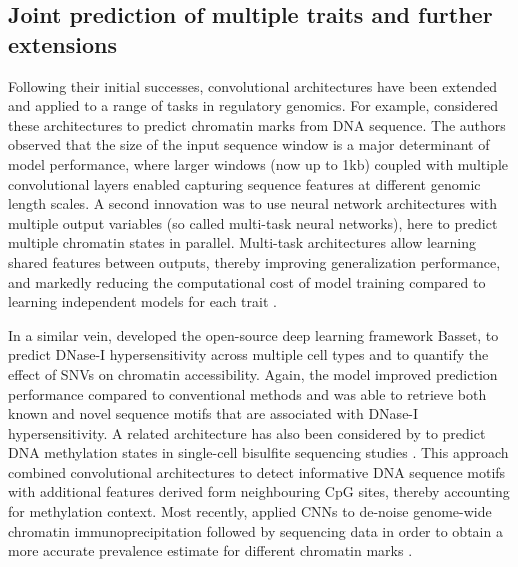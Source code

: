 \subsection{Joint prediction of multiple traits and further extensions}
Following their initial successes, convolutional architectures have been extended and applied to a range of tasks in regulatory genomics. For example, \citeauthor{zhou_predicting_2015} considered these architectures to predict chromatin marks from DNA sequence. The authors observed that the size of the input sequence window is a major determinant of model performance, where larger windows (now up to 1kb) coupled with multiple  convolutional layers enabled capturing sequence features at different genomic length scales. A second innovation was to use neural network architectures with multiple output variables (so called multi-task neural networks), here to predict multiple chromatin states in parallel. Multi-task architectures allow learning shared features between outputs, thereby improving generalization performance, and markedly reducing the computational cost of model training compared to learning independent models for each trait \citep{dahl_multi-task_2014}.

In a similar vein, \citeauthor{kelley_basset:_2016} developed the open-source deep learning framework Basset, to predict DNase-I hypersensitivity across multiple cell types and to quantify the effect of SNVs on chromatin accessibility. Again, the model improved prediction performance compared to conventional methods and was able to retrieve both known and novel sequence motifs that are associated with DNase-I hypersensitivity. A related architecture has also been considered by \citeauthor{angermueller_accurate_2017} to predict DNA methylation states in single-cell bisulfite sequencing studies \citep{angermueller_accurate_2017}. This approach combined convolutional architectures to detect informative DNA sequence motifs with additional features derived form neighbouring CpG sites, thereby accounting for methylation context. Most recently, \citeauthor{koh_denoising_2017} applied CNNs to de-noise genome-wide chromatin immunoprecipitation followed by sequencing data in order to obtain a more accurate prevalence estimate for different chromatin marks \citep{koh_denoising_2017}.

